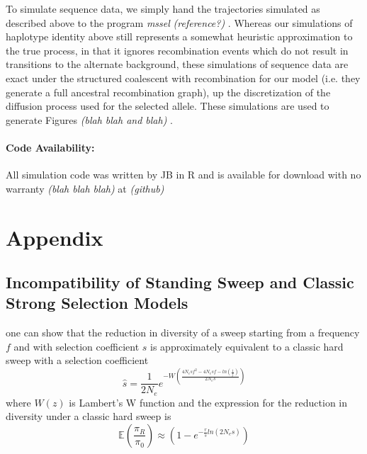 \documentclass[a4paper,10pt]{article}
\newcommand{\jb}[1]{{\it\color{blue} (#1)} }
\begin{document}
To simulate sequence data, we simply hand the trajectories simulated as described above to the program \textit{mssel} \jb{reference?}. Whereas our simulations of haplotype identity above still represents a somewhat heuristic approximation to the true process, in that it ignores recombination events which do not result in transitions to the alternate background, these simulations of sequence data are exact under the structured coalescent with recombination for our model (i.e. they generate a full ancestral recombination graph), up the discretization of the diffusion process used for the selected allele. These simulations are used to generate Figures \jb{blah blah and blah}.

\paragraph{Code Availability:} All simulation code was written by JB in R and is available for download with no warranty \jb{blah blah blah} at \jb{github}

\section{Appendix}

\subsection{Incompatibility of Standing Sweep and Classic Strong Selection Models}

one can show that the reduction in diversity of a sweep starting from a frequency $f$ and with selection coefficient $s$ is approximately equivalent to a classic hard sweep with a selection coefficient
\begin{equation}
	\hat{s} = \frac{1}{2N_e} e^{-W\left(\frac{4N_e sf^2 - 4N_e s f  - ln \left( \frac{1}{f} \right)}{2N_es}\right)}
\end{equation}
where $W\left(z\right)$ is Lambert's W function and the expression for the reduction in diversity under a classic hard sweep is
\begin{equation}
	\mathbb{E}\left(\frac{\pi_R}{\pi_0}\right) \approx \left(1- e^{-\frac{r}{\hat{s}}ln\left(2N_e \hat{s}\right)} \right)
\end{equation}
\citep{Pennings2006}
\end{document}
